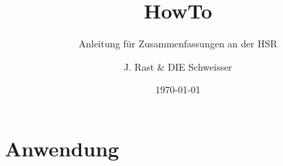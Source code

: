\documentclass[
	titlepage=true %
]{scrartcl}
\title{HowTo}
\subtitle{Anleitung für Zusammenfassungen an der HSR}
\author{J. Rast \& DIE Schweisser}
\date{\today}
\begin{document}
\maketitle
\tableofcontents
\newpage

\pagestyle{headings}


\section{Anwendung}
\end{document}
